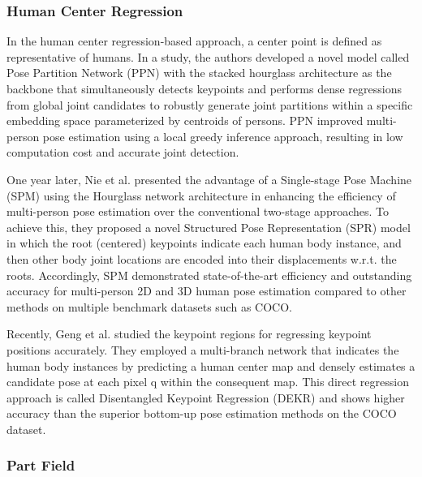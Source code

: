 \subsubsection{Human Center Regression}

In the human center regression-based approach, a center point is defined as representative of humans. In a study, the authors developed a novel model called Pose Partition Network (PPN) \cite{ferrari_pose_2018} with the stacked hourglass architecture \cite{newell_stacked_2016} as the backbone that simultaneously detects keypoints and performs dense regressions from global joint candidates to robustly generate joint partitions within a specific embedding space parameterized by centroids of persons. PPN improved multi-person pose estimation using a local greedy inference approach, resulting in low computation cost and accurate joint detection.

One year later, Nie et al. presented the advantage of a Single-stage Pose Machine (SPM) \cite{nie_single-stage_2019} using the Hourglass network architecture in enhancing the efficiency of multi-person pose estimation over the conventional two-stage approaches. To achieve this, they proposed a novel  Structured Pose Representation (SPR) model in which the root (centered) keypoints indicate each human body instance, and then other body joint locations are encoded into their displacements w.r.t. the roots. Accordingly, SPM demonstrated state-of-the-art efficiency and outstanding accuracy for multi-person 2D and 3D human pose estimation compared to other methods on multiple benchmark datasets such as COCO.

Recently, Geng et al. \cite{geng_bottom-up_2021} studied the keypoint regions for regressing keypoint positions accurately. They employed a multi-branch network that indicates the human body instances by predicting a human center map and densely estimates a candidate pose at each pixel q within the consequent map. This direct regression approach is called Disentangled Keypoint Regression (DEKR) and shows higher accuracy than the superior bottom-up pose estimation methods on the COCO dataset.

\subsubsection{Part Field}
 
